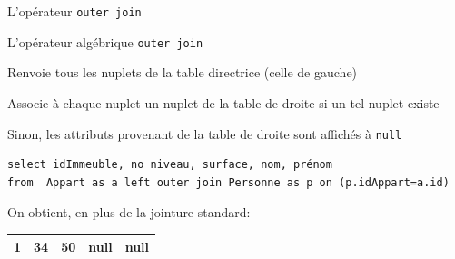 \begin{frame}[fragile]{L'opérateur \texttt{outer join}}

L'opérateur algébrique \texttt{outer join} 

\begin{redbullet}
   \item Renvoie tous les nuplets de la table directrice (celle de gauche)
   \item Associe à chaque nuplet un nuplet de la table de droite \alert{si un tel nuplet existe}
   \item Sinon, les attributs
provenant de la table de droite sont affichés à \texttt{null}
\end{redbullet}

\vfill


\begin{verbatim}
select idImmeuble, no niveau, surface, nom, prénom
from  Appart as a left outer join Personne as p on (p.idAppart=a.id)
\end{verbatim}

\vfill
On obtient, en plus de la jointure standard: 

\vfill
\begin{tabular}{c|c|c|c|c}
\hline
1 & 34 & 50 & null & null\\ \hline 
\end{tabular}

\end{frame}



